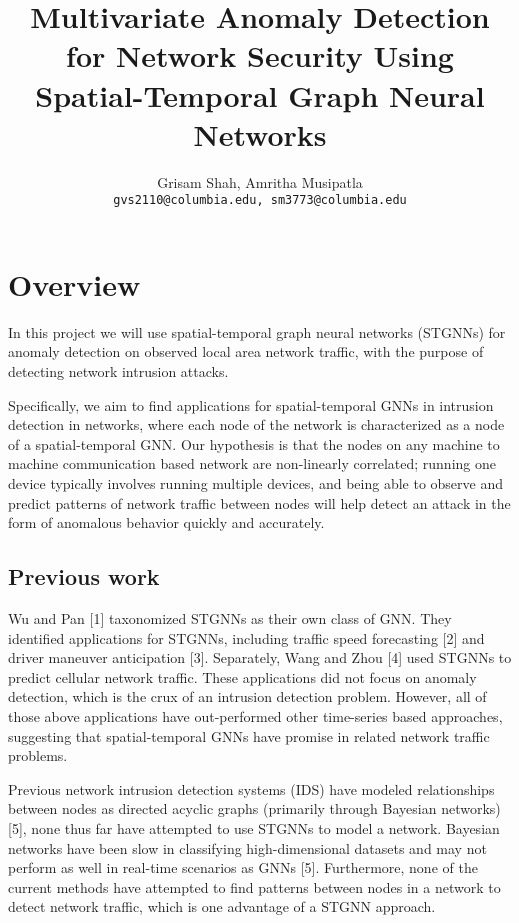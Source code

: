 \documentclass{article}
\title{Multivariate Anomaly Detection for Network Security Using Spatial-Temporal Graph Neural Networks}
\author{%
  Grisam Shah, Amritha Musipatla \\
  \texttt{gvs2110@columbia.edu, sm3773@columbia.edu} \\
}
\begin{document}
\maketitle

\section{Overview}

In this project we will use spatial-temporal graph neural networks (STGNNs) for anomaly detection on observed local area network traffic, with the purpose of detecting network intrusion attacks. 

Specifically, we aim to find applications for spatial-temporal GNNs in intrusion detection in networks, where each node of the network is characterized as a node of a spatial-temporal GNN. Our hypothesis is that the nodes on any machine to machine communication based network are non-linearly correlated; running one device typically involves running multiple devices, and being able to observe and predict patterns of network traffic between nodes will help detect an attack in the form of anomalous behavior quickly and accurately.

\subsection{Previous work}

Wu and Pan [1] taxonomized STGNNs as their own class of GNN. They identified applications for STGNNs, including traffic speed forecasting [2] and driver maneuver anticipation [3]. Separately, Wang and Zhou [4] used STGNNs to predict cellular network traffic. These applications did not focus on anomaly detection, which is the crux of an intrusion detection problem. However, all of those above applications have out-performed other time-series based approaches, suggesting that spatial-temporal GNNs have promise in related network traffic problems. 

Previous network intrusion detection systems (IDS) have modeled relationships between nodes as directed acyclic graphs (primarily through Bayesian networks) [5], none thus far have attempted to use STGNNs to model a network. Bayesian networks have been slow in classifying high-dimensional datasets and may not perform as well in real-time scenarios as GNNs [5]. Furthermore, none of the current methods have attempted to find patterns between nodes in a network to detect network traffic, which is one advantage of a STGNN approach.
\end{document}
